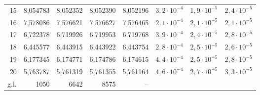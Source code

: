 \begin{tabular}{r rrrr rrr}
15 & 8,054783 & 8,052352 & 8,052390 & 8,052196 & $3{,}2\cdot10^{-4}$ & $1{,}9\cdot10^{-5}$ & $2{,}4\cdot10^{-5}$ \\
16 & 7,578086 & 7,576621 & 7,576627 & 7,576465 & $2{,}1\cdot10^{-4}$ & $2{,}1\cdot10^{-5}$ & $2{,}1\cdot10^{-5}$ \\
17 & 6,722378 & 6,719926 & 6,719953 & 6,719768 & $3{,}9\cdot10^{-4}$ & $2{,}4\cdot10^{-5}$ & $2{,}8\cdot10^{-5}$ \\
18 & 6,445577 & 6,443915 & 6,443922 & 6,443754 & $2{,}8\cdot10^{-4}$ & $2{,}5\cdot10^{-5}$ & $2{,}6\cdot10^{-5}$ \\
19 & 6,177345 & 6,174771 & 6,174786 & 6,174615 & $4{,}4\cdot10^{-4}$ & $2{,}5\cdot10^{-5}$ & $2{,}8\cdot10^{-5}$ \\
20 & 5,763787 & 5,761319 & 5,761355 & 5,761164 & $4{,}6\cdot10^{-4}$ & $2{,}7\cdot10^{-5}$ & $3{,}3\cdot10^{-5}$ \\
\midrule
g.l. & 1050 & 6642 & 8575 & -- & & & \\
\bottomrule
\end{tabular}
